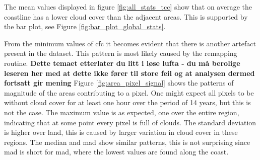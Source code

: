 The mean values displayed in figure \ref{fig:all_stats_tcc} show that on average the coastline has a lower cloud cover than the adjacent areas. This is supported by the bar plot, see Figure \ref{fig:bar_plot_global_stats}. 

From the minimum values of \acrshort{cfc} it becomes evident that there is another artefact present in the dataset. This pattern is most likely caused by the remapping routine. \textbf{Dette temaet etterlater du litt i løse lufta - du må berolige leseren her med at dette ikke fører til store feil og at analysen dermed fortsatt gir mening} 
Figure \ref{fig:area_pixel_signal} shows the patterns of magnitude of the areas contributing to a pixel. One might expect all pixels to be without cloud cover for at least one hour over the period of 14 years, but this is not the case. The maximum value is as expected, one over the entire region, indicating that at some point every pixel is full of clouds. The standard deviation is higher over land, this is caused by larger variation in cloud cover in these regions. The median and \acrshort{mad} 
show similar patterns, this is not surprising since \acrshort{mad} is short for \acrlong{mad}, where the lowest values are found along the coast.

